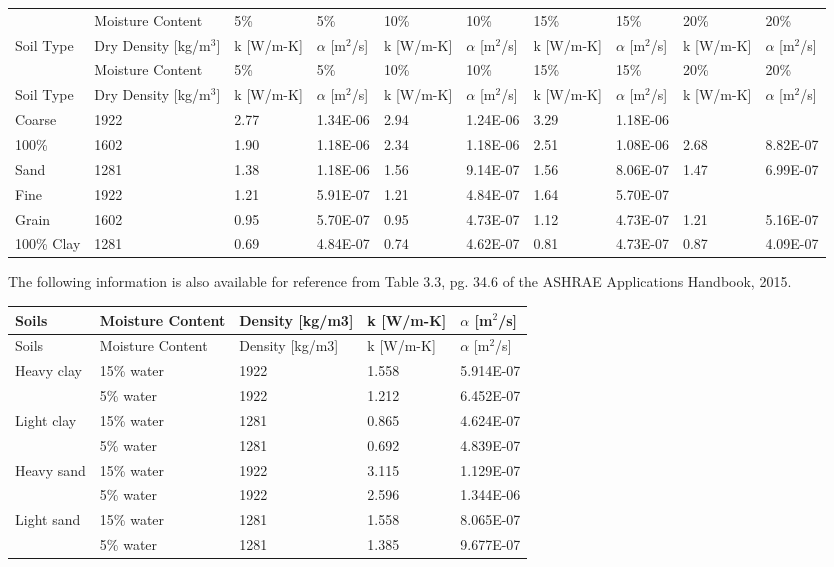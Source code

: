 {\scriptsize
\begin{longtable}[c]{>{\raggedright}p{0.55in}>{\raggedright}p{0.55in}>{\raggedright}p{0.55in}>{\raggedright}p{0.55in}>{\raggedright}p{0.55in}>{\raggedright}p{0.55in}>{\raggedright}p{0.55in}>{\raggedright}p{0.55in}>{\raggedright}p{0.55in}>{\raggedright}p{0.55in}}
\toprule 
 & Moisture Content & 5\% & 5\% & 10\% & 10\% & 15\% & 15\% & 20\% & 20\% \tabularnewline
Soil Type & Dry Density  [kg/m\(^3\)] & k  [W/m-K] & \({\alpha}\)   [m\(^2\)/s] & k  [W/m-K] & \({\alpha}\)   [m\(^2\)/s] & k  [W/m-K] & \({\alpha}\)   [m\(^2\)/s] & k  [W/m-K] & \({\alpha}\)   [m\(^2\)/s] \tabularnewline
\midrule
\endfirsthead

\toprule 
 & Moisture Content & 5\% & 5\% & 10\% & 10\% & 15\% & 15\% & 20\% & 20\% \tabularnewline
Soil Type & Dry Density  [kg/m\(^3\)] & k  [W/m-K] & \({\alpha}\)   [m\(^2\)/s] & k  [W/m-K] & \({\alpha}\)   [m\(^2\)/s] & k  [W/m-K] & \({\alpha}\)   [m\(^2\)/s] & k  [W/m-K] & \({\alpha}\)   [m\(^2\)/s] \tabularnewline
\midrule
\endhead

Coarse & 1922 & 2.77 & 1.34E-06 & 2.94 & 1.24E-06 & 3.29 & 1.18E-06 &  &  \tabularnewline
100\% & 1602 & 1.90 & 1.18E-06 & 2.34 & 1.18E-06 & 2.51 & 1.08E-06 & 2.68 & 8.82E-07 \tabularnewline
Sand & 1281 & 1.38 & 1.18E-06 & 1.56 & 9.14E-07 & 1.56 & 8.06E-07 & 1.47 & 6.99E-07 \tabularnewline
\midrule
Fine & 1922 & 1.21 & 5.91E-07 & 1.21 & 4.84E-07 & 1.64 & 5.70E-07 &  &  \tabularnewline
Grain & 1602 & 0.95 & 5.70E-07 & 0.95 & 4.73E-07 & 1.12 & 4.73E-07 & 1.21 & 5.16E-07 \tabularnewline
100\% Clay & 1281 & 0.69 & 4.84E-07 & 0.74 & 4.62E-07 & 0.81 & 4.73E-07 & 0.87 & 4.09E-07 \tabularnewline
\bottomrule
\end{longtable}}

The following information is also available for reference from Table 3.3, pg. 34.6 of the ASHRAE Applications Handbook, 2015.

\begin{longtable}[c]{>{\raggedright}p{1.2in}>{\raggedright}p{1.2in}>{\raggedright}p{1.2in}>{\raggedright}p{1.2in}>{\raggedright}p{1.2in}}
\toprule 
Soils & Moisture  Content & Density  [kg/m3] & k  [W/m-K] & \({\alpha}\)   [m\(^2\)/s] \tabularnewline
\midrule
\endfirsthead

\toprule 
Soils & Moisture  Content & Density  [kg/m3] & k  [W/m-K] & \({\alpha}\)   [m\(^2\)/s] \tabularnewline
\midrule
\endhead

Heavy clay & 15\% water & 1922 & 1.558 & 5.914E-07 \tabularnewline
 & 5\% water & 1922 & 1.212 & 6.452E-07 \tabularnewline
Light clay & 15\% water & 1281 & 0.865 & 4.624E-07 \tabularnewline
 & 5\% water & 1281 & 0.692 & 4.839E-07 \tabularnewline
Heavy sand & 15\% water & 1922 & 3.115 & 1.129E-07 \tabularnewline
 & 5\% water & 1922 & 2.596 & 1.344E-06 \tabularnewline
Light sand & 15\% water & 1281 & 1.558 & 8.065E-07 \tabularnewline
 & 5\% water & 1281 & 1.385 & 9.677E-07 \tabularnewline
\bottomrule
\end{longtable}

